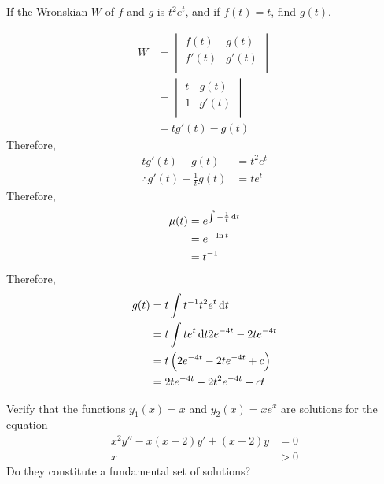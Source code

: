 \documentclass[fleqn, a4paper, 11pt, oneside]{amsart}
\theoremstyle{definition}
\theoremstyle{theorem}
\begin{document}
\begin{question}
	If the Wronskian $W$ of $f$ and $g$ is $t^2 e^t$, and if $f(t) = t$, find $g(t)$.
\end{question}

\begin{solution}
	\begin{align*}
		W &=
			\begin{vmatrix}
				f(t)  & g(t)  \\
				f'(t) & g'(t) \\
			\end{vmatrix}\\
		  &=
			\begin{vmatrix}
				t & g(t)  \\
				1 & g'(t) \\
			\end{vmatrix}\\
		  &= t g'(t) - g(t)
	\end{align*}
	Therefore,
	\begin{align*}
		t g'(t) - g(t)                      & = t^2 e^t \\
		\therefore g'(t) - \frac{1}{t} g(t) & = t e^t
	\end{align*}
	Therefore,
	\begin{align*}
		\mu(t) & = e^{\int -\frac{1}{t} \dif t} \\
                       & = e^{-\ln t}                   \\
                       & = t^{-1}
	\end{align*}
	Therefore,
	\begin{align*}
		g(t) & = t \int t^{-1} t^2 e^t \dif t                   \\
                     & = t \int t e^t \dif t2 e^{-4 t}-2 t e^{-4 t}     \\
                     & = t \left( 2 e^{-4 t} - 2 t e^{-4 t} + c \right) \\
                     & = 2 t e^{-4 t} - 2 t^2 e^{-4 t} + c t
	\end{align*}
\end{solution}

\begin{question}
	Verify that the functions $y_1(x) = x$ and $y_2(x) = x e^x$ are solutions for the equation
	\begin{align*}
		x^2 y'' - x (x + 2) y' + (x + 2) y & = 0 \\
		x                                  & > 0
	\end{align*}
	Do they constitute a fundamental set of solutions?
\end{question}
\end{document}
